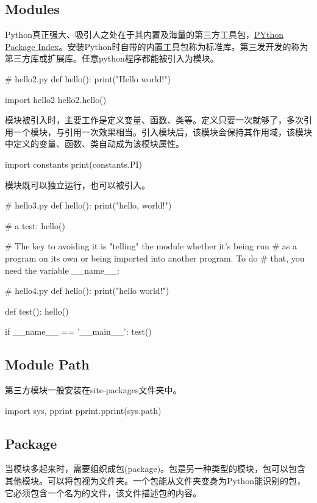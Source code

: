 \subsection{Modules}
Python真正强大、吸引人之处在于其内置及海量的第三方工具包，\href{https://pypi.python.org/pypi}{PYthon Package Index}。安装Python时自带的内置工具包称为标准库。第三发开发的称为第三方库或扩展库。任意python程序都能被引入为模块。
\begin{python}
# hello2.py
def hello():
    print("Hello world!")

import hello2
hello2.hello()  
\end{python}
模块被引入时，主要工作是定义变量、函数、类等。定义只要一次就够了，多次引用一个模块，与引用一次效果相当。引入模块后，该模块会保持其作用域，该模块中定义的变量、函数、类自动成为该模块属性。
\begin{python}
import constants
print(constants.PI)
\end{python}
模块既可以独立运行，也可以被引入。
\begin{python}
# hello3.py
def hello():
    print("hello, world!")

# a test:
hello()

# The key to avoiding it is "telling" the module whether it's being run
# as a program on its own or being imported into another program.  To do
# that,  you need the variable __name__:

# hello4.py
def hello():
    print("hello world!")

def test():
    hello()

if __name__ == '__main__':
    test()
\end{python}
\subsection{Module Path}
第三方模块一般安装在site-packages文件夹中。
\begin{python}
import sys, pprint
pprint.pprint(sys.path)
\end{python}
\subsection{Package}
当模块多起来时，需要组织成包(package)。包是另一种类型的模块，包可以包含其他模块。可以将包视为文件夹。一个包能从文件夹变身为Python能识别的包，它必须包含一个名为的文件，该文件描述包的内容。

